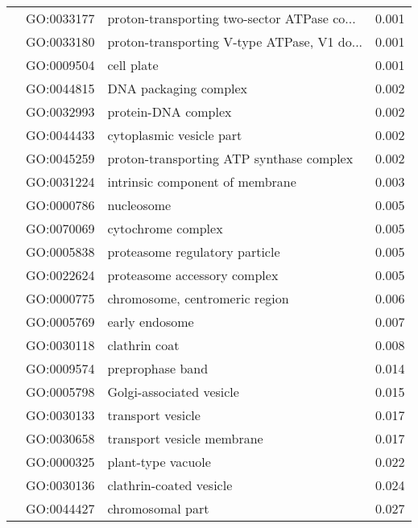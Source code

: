 \begin{longtable}{lllr}
   & GO:0033177 &  proton-transporting two-sector ATPase co... &         0.001 \\
   & GO:0033180 &  proton-transporting V-type ATPase, V1 do... &         0.001 \\
   & GO:0009504 &                                   cell plate &         0.001 \\
   & GO:0044815 &                        DNA packaging complex &         0.002 \\
   & GO:0032993 &                          protein-DNA complex &         0.002 \\
   & GO:0044433 &                     cytoplasmic vesicle part &         0.002 \\
   & GO:0045259 &     proton-transporting ATP synthase complex &         0.002 \\
   & GO:0031224 &              intrinsic component of membrane &         0.003 \\
   & GO:0000786 &                                   nucleosome &         0.005 \\
   & GO:0070069 &                           cytochrome complex &         0.005 \\
   & GO:0005838 &               proteasome regulatory particle &         0.005 \\
   & GO:0022624 &                 proteasome accessory complex &         0.005 \\
   & GO:0000775 &               chromosome, centromeric region &         0.006 \\
   & GO:0005769 &                               early endosome &         0.007 \\
   & GO:0030118 &                                clathrin coat &         0.008 \\
   & GO:0009574 &                             preprophase band &         0.014 \\
   & GO:0005798 &                     Golgi-associated vesicle &         0.015 \\
   & GO:0030133 &                            transport vesicle &         0.017 \\
   & GO:0030658 &                   transport vesicle membrane &         0.017 \\
   & GO:0000325 &                           plant-type vacuole &         0.022 \\
   & GO:0030136 &                      clathrin-coated vesicle &         0.024 \\
   & GO:0044427 &                             chromosomal part &         0.027 \\

\end{longtable}
